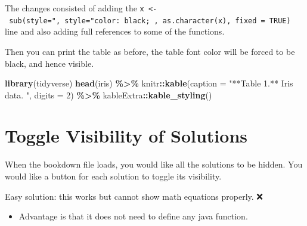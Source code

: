 \documentclass[
]{book}
\newenvironment{Shaded}{\begin{snugshade}}{\end{snugshade}}
\newcommand{\AttributeTok}[1]{\textcolor[rgb]{0.13,0.29,0.53}{#1}}
\newcommand{\DataTypeTok}[1]{\textcolor[rgb]{0.13,0.29,0.53}{#1}}
\newcommand{\DecValTok}[1]{\textcolor[rgb]{0.00,0.00,0.81}{#1}}
\newcommand{\FunctionTok}[1]{\textcolor[rgb]{0.13,0.29,0.53}{\textbf{#1}}}
\newcommand{\KeywordTok}[1]{\textcolor[rgb]{0.13,0.29,0.53}{\textbf{#1}}}
\newcommand{\NormalTok}[1]{#1}
\newcommand{\OperatorTok}[1]{\textcolor[rgb]{0.81,0.36,0.00}{\textbf{#1}}}
\newcommand{\OtherTok}[1]{\textcolor[rgb]{0.56,0.35,0.01}{#1}}
\newcommand{\SpecialCharTok}[1]{\textcolor[rgb]{0.81,0.36,0.00}{\textbf{#1}}}
\newcommand{\StringTok}[1]{\textcolor[rgb]{0.31,0.60,0.02}{#1}}
\providecommand{\tightlist}{%
  \setlength{\itemsep}{0pt}\setlength{\parskip}{0pt}}
\theoremstyle{definition}
\theoremstyle{definition}
\theoremstyle{definition}
\theoremstyle{definition}
\theoremstyle{remark}
\begin{document}
The changes consisted of adding the \texttt{x\ \textless{}-\ sub(\textquotesingle{}style="\textquotesingle{},\ \textquotesingle{}style="color:\ black;\ \textquotesingle{},\ as.character(x),\ fixed\ =\ TRUE)} line and also adding full references to some of the functions.

Then you can print the table as before, the table font color will be forced to be black, and hence visible.

\begin{Shaded}
\begin{Highlighting}[]
\FunctionTok{library}\NormalTok{(tidyverse)}
\FunctionTok{head}\NormalTok{(iris) }\SpecialCharTok{\%\textgreater{}\%} 
\NormalTok{  knitr}\SpecialCharTok{::}\FunctionTok{kable}\NormalTok{(}\AttributeTok{caption =} \StringTok{"**Table 1.** Iris data. "}\NormalTok{, }\AttributeTok{digits =} \DecValTok{2}\NormalTok{) }\SpecialCharTok{\%\textgreater{}\%} 
\NormalTok{  kableExtra}\SpecialCharTok{::}\FunctionTok{kable\_styling}\NormalTok{()}
\end{Highlighting}
\end{Shaded}

\section{Toggle Visibility of Solutions}\label{toggle-visibility-of-solutions}

When the bookdown file loads, you would like all the solutions to be hidden. You would like a button for each solution to toggle its visibility.

Easy solution: this works but cannot show math equations properly. ❌

\begin{itemize}
\tightlist
\item
  Advantage is that it does not need to define any java function.
\end{itemize}

\begin{Shaded}
\end{Shaded}
\end{document}
